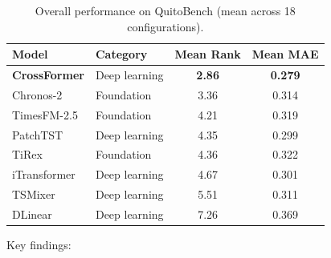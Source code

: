 \documentclass[11pt]{article}
\begin{document}
\begin{table}[h]
\centering
\caption{Overall performance on QuitoBench (mean across 18 configurations).}
\begin{tabular}{llcc}
\toprule
\textbf{Model} & \textbf{Category} & \textbf{Mean Rank} & \textbf{Mean MAE} \\
\midrule
\textbf{CrossFormer} & Deep learning & \textbf{2.86} & \textbf{0.279} \\
Chronos-2 & Foundation & 3.36 & 0.314 \\
TimesFM-2.5 & Foundation & 4.21 & 0.319 \\
PatchTST & Deep learning & 4.35 & 0.299 \\
TiRex & Foundation & 4.36 & 0.322 \\
iTransformer & Deep learning & 4.67 & 0.301 \\
TSMixer & Deep learning & 5.51 & 0.311 \\
DLinear & Deep learning & 7.26 & 0.369 \\
\bottomrule
\end{tabular}
\end{table}

Key findings:
\end{document}
